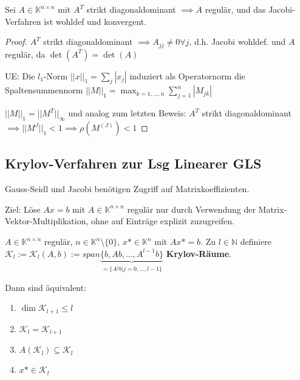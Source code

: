 \begin{corollary}
	Sei $A \in \mathbb{K}^{n \times n}$ mit $A^T$ strikt diagonaldominant $\implies A$ regulär, und das Jacobi-Verfahren ist wohldef und konvergent.
\end{corollary}

\begin{proof}
	$A^T$ strikt diagonaldominant $\implies A_{jj} \neq 0 \forall j$, d.h. Jacobi wohldef. und $A$ regulär, da $\det(A^T) = \det(A)$
	
	UE: Die $l_1$-Norm $||x||_1 = \sum_j |x_j|$ induziert als Operatornorm die Spaltensummennorm $||M||_1 = \max_{k=1, ..., n} \sum_{j=1}^{n}|M_{jk}|$
	
	$||M||_1 = ||M^T||_\infty$ und analog zum letzten Beweis: $A^T$ strikt diagonaldominant $\implies ||M^J||_1 < 1 \implies \rho(M^{(J)}) < 1$
\end{proof}

\subsection{Krylov-Verfahren zur Lsg Linearer GLS}

Gauss-Seidl und Jacobi benötigen Zugriff auf Matrixkoeffizienten. 

Ziel: Löse $Ax=b$ mit $A \in \mathbb{K}^{n\times n}$ regulär nur durch Verwendung der Matrix-Vektor-Multiplikation, ohne auf Einträge explizit zuzugreifen.

\begin{lemma}
	$A \in \mathbb{K}^{n \times n}$ regulär, $n \in \mathbb{K}^n\setminus\{0\}$, $x* \in \mathbb{K}^n$ mit $Ax*=b$. Zu $l \in \mathbb{N}$ definiere $\mathcal{K}_l := \mathcal{K}_l(A,b) := span\underbrace{\{b, Ab, ..., A^{l-1}b\}}_{= \{A^jb | j=0, ..., l-1\}}$ \textbf{Krylov-Räume}.
	
	Dann sind äquivalent:
	\begin{enumerate}
		\item $\dim \mathcal{K}_{l+1} \leq l$
		\item $\mathcal{K}_{l} = \mathcal{K}_{l+1}$
		\item $A(\mathcal{K}_l) \subseteq \mathcal{K}_l$
		\item $x* \in \mathcal{K}_l$
	\end{enumerate}
\end{lemma}

